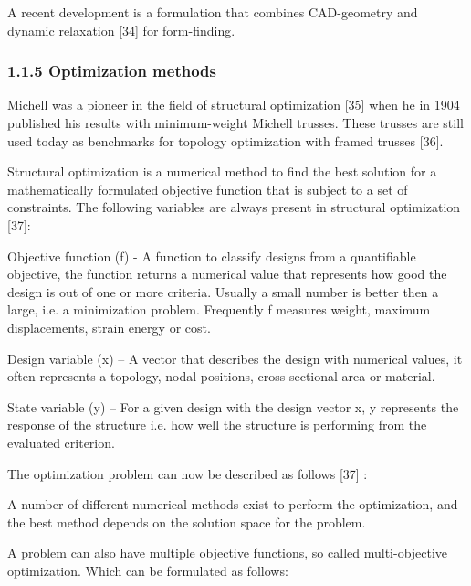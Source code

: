 A recent development is a formulation that combines CAD-geometry and dynamic relaxation [34] for form-finding.









\subsubsection[1.1.5 Optimization methods]{1.1.5 Optimization methods}
Michell was a pioneer in the field of structural optimization [35] when he in 1904 published his results with minimum-weight Michell trusses. These trusses are still used today as benchmarks for topology optimization with framed trusses [36]. 



Structural optimization is a numerical method to find the best solution for a mathematically formulated objective function that is subject to a set of constraints. The following variables are always present in structural optimization [37]:

\item Objective function (f) {}- A function to classify designs from a quantifiable objective, the function returns a numerical value that represents how good the design is out of one or more criteria. Usually a small number is better then a large, i.e. a minimization problem. Frequently f measures weight, maximum displacements, strain energy or cost.

\item Design variable (x) – A vector that describes the design with numerical values, it often represents a topology, nodal positions, cross sectional area or material.

\item State variable (y) – For a given design with the design vector x, y represents the response of the structure i.e. how well the structure is performing from the evaluated criterion.



The optimization problem can now be described as follows [37] :



 A number of different numerical methods exist to perform the optimization, and the best method depends on the solution space for the problem.



A problem can also have multiple objective functions, so called multi-objective optimization. Which can be formulated as follows:


